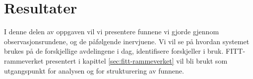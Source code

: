 \chapter{Resultater}
\label{chp:resultater} 

I denne delen av oppgaven vil vi presentere funnene vi gjorde gjennom observasjonsrundene, og de påfølgende inervjuene. Vi vil se på hvordan systemet brukes på de forskjellige avdelingene i dag, identifisere forskjeller i bruk. FITT-rammeverket presentert i kapittel \ref{sec:fitt-rammeverket} vil bli brukt som utgangspunkt for analysen og for strukturering av funnene.



